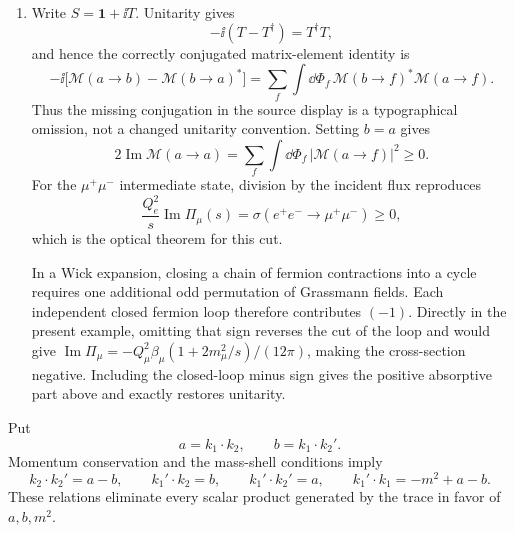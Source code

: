 \begin{enumerate}
\begin{enumerate}
For negligible electron mass, the same cut gives
\[
 \sigma(e^+e^-\to\mu^+\mu^-)
 =\frac{Q_e^2}{s}\operatorname{Im}\Pi_\mu(s+\ii0)
 =\frac{Q_e^2Q_\mu^2}{12\pi s}
 \left(1+\frac{2m_\mu^2}{s}\right)\beta_\mu,
\]
which identifies precisely the \(Q_e^2Q_\mu^2\) contribution to the
forward amplitude.
\item
Write \(S=\mathbf1+\ii T\).  Unitarity gives
\[
 -\ii(T-T^\dagger)=T^\dagger T,
\]
and hence the correctly conjugated matrix-element identity is
\[
 -\ii\bigl[\mathcal M(a\to b)-\mathcal M(b\to a)^*\bigr]
 =\sum_f\int \dd\Phi_f\,
 \mathcal M(b\to f)^*\mathcal M(a\to f).
\]
Thus the missing conjugation in the source display is a typographical
omission, not a changed unitarity convention.  Setting \(b=a\) gives
\[
 2\operatorname{Im}\mathcal M(a\to a)
 =\sum_f\int \dd\Phi_f\,|\mathcal M(a\to f)|^2\geq0.
\]
For the \(\mu^+\mu^-\) intermediate state, division by the incident flux
reproduces
\[
 \frac{Q_e^2}{s}\operatorname{Im}\Pi_\mu(s)
 =\sigma(e^+e^-\to\mu^+\mu^-)\geq0,
\]
which is the optical theorem for this cut.

In a Wick expansion, closing a chain of fermion contractions into a cycle
requires one additional odd permutation of Grassmann fields.  Each
independent closed fermion loop therefore contributes \((-1)\).  Directly
in the present example, omitting that sign reverses the cut of the loop and
would give
\(\operatorname{Im}\Pi_\mu=-Q_\mu^2\beta_\mu
(1+2m_\mu^2/s)/(12\pi)\), making the cross-section negative.  Including the
closed-loop minus sign gives the positive absorptive part above and exactly
restores unitarity.
\end{enumerate}

Put
\[
 a=k_1\cdot k_2,
 \qquad b=k_1\cdot k_2'.
\]
Momentum conservation and the mass-shell conditions imply
\[
 k_2\cdot k_2'=a-b,
 \qquad k_1'\cdot k_2=b,
 \qquad k_1'\cdot k_2'=a,
 \qquad k_1'\cdot k_1=-m^2+a-b.
\]
These relations eliminate every scalar product generated by the trace in
favor of \(a,b,m^2\).


\end{enumerate}
